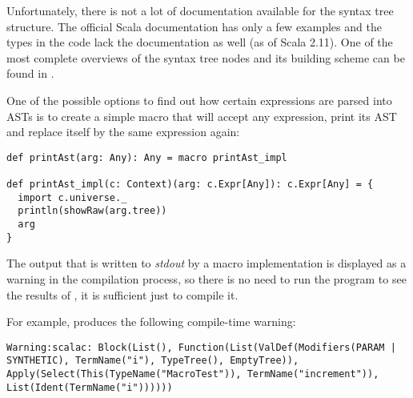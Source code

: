 Unfortunately, there is not a lot of documentation available for the syntax tree structure. The official Scala documentation has only a few examples and the types in the code lack the documentation as well (as of Scala 2.11). One of the most complete overviews of the syntax tree nodes and its building scheme can be found in \cite{noauthor_wolfe:_2017}.

One of the possible options to find out how certain expressions are parsed into ASTs is to create a simple macro that will accept any expression, print its AST and replace itself by the same expression again:

\lstset{style=Scala}
\begin{lstlisting}
def printAst(arg: Any): Any = macro printAst_impl

def printAst_impl(c: Context)(arg: c.Expr[Any]): c.Expr[Any] = {
  import c.universe._
  println(showRaw(arg.tree))
  arg
}
\end{lstlisting}

The output that is written to \textit{stdout} by a macro implementation is displayed as a warning in the compilation process, so there is no need to run the program to see the results of , it is sufficient just to compile it.

For example,  produces the following compile-time warning:

\lstset{style=Dump}
\begin{lstlisting}
Warning:scalac: Block(List(), Function(List(ValDef(Modifiers(PARAM | SYNTHETIC), TermName("i"), TypeTree(), EmptyTree)), Apply(Select(This(TypeName("MacroTest")), TermName("increment")), List(Ident(TermName("i"))))))
\end{lstlisting}


